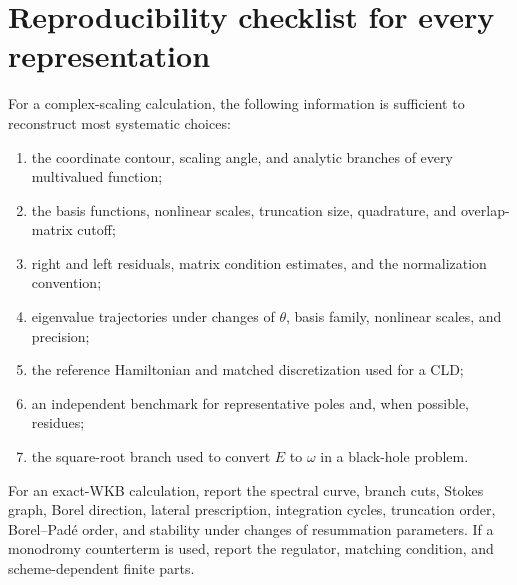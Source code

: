 \section{Reproducibility checklist for every representation}
\label{app:numerical-checklist}

For a complex-scaling calculation, the following information is sufficient to
reconstruct most systematic choices:
\begin{enumerate}
  \item the coordinate contour, scaling angle, and analytic branches of every
  multivalued function;

  \item the basis functions, nonlinear scales, truncation size, quadrature,
  and overlap-matrix cutoff;

  \item right and left residuals, matrix condition estimates, and the
  normalization convention;

  \item eigenvalue trajectories under changes of $\theta$, basis family,
  nonlinear scales, and precision;

  \item the reference Hamiltonian and matched discretization used for a CLD;

  \item an independent benchmark for representative poles and, when possible,
  residues;

  \item the square-root branch used to convert $E$ to $\omega$ in a
  black-hole problem.
\end{enumerate}

For an exact-WKB calculation, report the spectral curve, branch cuts, Stokes
graph, Borel direction, lateral prescription, integration cycles, truncation
order, Borel--Pad\'e order, and stability under changes of resummation
parameters.  If a monodromy counterterm is used, report the regulator, matching
condition, and scheme-dependent finite parts.
